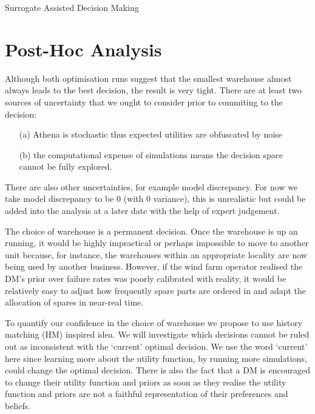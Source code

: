 \begin{chapter}{Surrogate Assisted Decision Making \label{Chap:optimisation}}
\section{Post-Hoc Analysis}

Although both optimisation runs suggest that the smallest warehouse almost always leads to the best decision, the result is very tight. There are at least two sources of uncertainty that we ought to consider prior to commiting to the decision:
\begin{itemize}
  \item[(a)] Athena is stochastic thus expected utilities are obfuscated by noise
  \item[(b)] the computational expense of simulations means the decision space cannot be fully explored.
\end{itemize}
There are also other uncertainties, for example model discrepancy. For now we take model discrepancy to be $0$ (with $0$ variance), this is unrealistic but could be added into the analysis at a later date with the help of expert judgement.

 The choice of warehouse is a permanent decision. Once the warehouse is up an running, it would be highly impractical or perhaps impossible to move to another unit because, for instance, the warehouses within an appropriate locality are now being used by another business. However, if the wind farm operator realised the DM's prior over failure rates was poorly calibrated with reality, it would be relatively easy to adjust how frequently spare parts are ordered in and adapt the allocation of spares in near-real time.

To quantify our confidence in the choice of warehouse we propose to use history matching (HM) inspired idea. We will investigate which decisions cannot be ruled out as inconsistent with the `current' optimal decision. We use the word `current' here since learning more about the utility function, by running more simulations, could change the optimal decision. There is also the fact that a DM is encouraged to change their utility function and priors as soon as they realise the utility function and priors are not a faithful representation of their preferences and beliefs.


\end{chapter}
